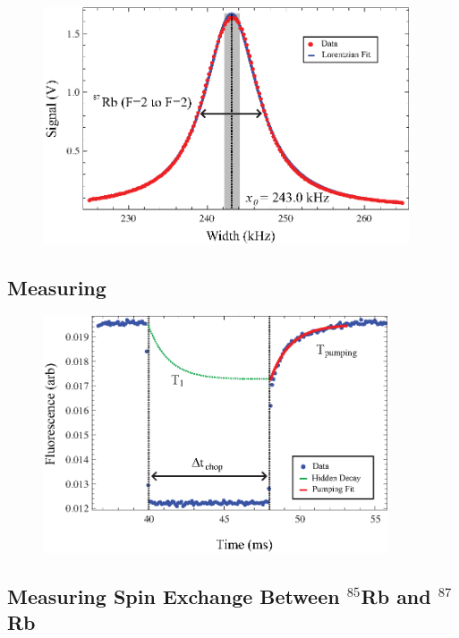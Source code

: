 \begin{figure}[htbp]
\begin{center}
\includegraphics[height=70mm]{./figures/87raw_width.eps}
\caption{\small{}}
\label{fig:87raw}
\end{center}
\end{figure}

\subsection{Measuring}

\begin{figure}[htbp]
\begin{center}
\includegraphics[height=70mm]{./figures/raw_chop.eps}
\caption{\small{}}
\label{fig:chop}
\end{center}
\end{figure}

\subsection{Measuring Spin Exchange Between $^{85}$Rb and $^{87}$Rb}